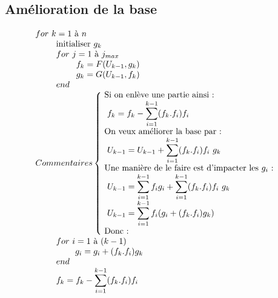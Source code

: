 \subsection{Amélioration de la base}
\label{AlgorithmesPGDOrthoCorrect}
\begin{equation}{}
\begin{array}{l}
 for~k = 1$ à $ n \\
 \phantom{for~k} $initialiser $g_k \\
 \phantom{for~k} for~j=1$ à $j_{max} \\
 \phantom{for~k for~j } f_k = F (U_{k-1},g_k) \\
 \phantom{for~k for~j } g_k = G (U_{k-1},f_k) \\
 \phantom{for~k} end \\ 
 
 Commentaires
 \left\{\!
	 \begin{array}{l}
	 $Si on enlève une partie ainsi :$\\
	 \displaystyle
	 ~f_k = f_k - \sum_{i=1}^{k-1} (f_k.f_i)f_i\\
	 $On veux améliorer la base par :$\\
	 \displaystyle
	 ~U_{k-1} = U_{k-1} 
	 			+ \sum_{i=1}^{k-1} (f_k.f_i)f_i ~ g_k\\
	 $Une manière de le faire est d'impacter les $g_i$ :$\\
	 \displaystyle
	 ~U_{k-1} = \sum_{i=1}^{k-1} f_i g_i 
	 			+ \sum_{i=1}^{k-1} (f_k.f_i)f_i ~ g_k\\
	 \displaystyle
	 ~U_{k-1} = \sum_{i=1}^{k-1} f_i (g_i + (f_k.f_i)g_k)\\
	 $Donc :$\\
	 \end{array}
 \right.
 \\
 \phantom{for~k} for~i=1$ à $(k-1) \\
 \phantom{for~k for~i } g_i = g_i + (f_k.f_i)g_k\\
 \phantom{for~k} end\\
 \displaystyle
 \phantom{for~k} f_k = f_k - \sum_{i=1}^{k-1} (f_k.f_i)f_i\\
 

\end{array}
\end{equation}
